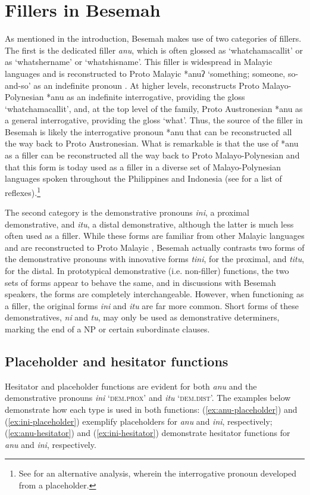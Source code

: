 \documentclass[output=paper,
\ChapterDOI{10.5281/zenodo.15697583}
colorlinks,
citecolor=brown]{langscibook}
\begin{document}
\section{Fillers in Besemah}\label{sec:fillers}
As mentioned in the introduction, Besemah makes use of two categories of fillers. The first is the dedicated filler \textit{anu}, which is often glossed as `whatchamacallit' or as `whatshername' or `whatshisname'. This filler is widespread in Malayic languages and is reconstructed to Proto Malayic *anuʔ `something; someone, so-and-so' as an indefinite pronoun \citep[128--129]{adelaar1992protomalayic}. At higher levels, \citet[516]{blust2013austronesian} reconstructs Proto Malayo-Polynesian *anu as an indefinite interrogative, providing the gloss `whatchamacallit', and, at the top level of the family, Proto Austronesian *anu as a general interrogative, providing the gloss `what'. Thus, the source of the filler in Besemah is likely the interrogative pronoun *anu that can be reconstructed all the way back to Proto Austronesian. What is remarkable is that the use of *anu as a filler can be reconstructed all the way back to Proto Malayo-Polynesian and that this form is today used as a filler in a diverse set of Malayo-Polynesian languages spoken throughout the Philippines and Indonesia (see \cite{blust2023acd} for a list of reflexes).\footnote{See \citet[][92--93]{nagaya2022tagalog} for an alternative analysis, wherein the interrogative pronoun developed from a placeholder.}

The second category is the demonstrative pronouns \textit{ini}, a proximal demonstrative, and \textit{itu}, a distal demonstrative, although the latter is much less often used as a filler. While these forms are familiar from other Malayic languages and are reconstructed to Proto Malayic \citep[129]{adelaar1992protomalayic}, Besemah actually contrasts two forms of the demonstrative pronouns with innovative forms \textit{tini}, for the proximal, and \textit{titu}, for the distal. In prototypical demonstrative (i.e. non-filler) functions, the two sets of forms appear to behave the same, and in discussions with Besemah speakers, the forms are completely interchangeable. However, when functioning as a filler, the original forms \textit{ini} and \textit{itu} are far more common. Short forms of these demonstratives, \textit{ni} and \textit{tu}, may only be used as demonstrative determiners, marking the end of a NP or certain subordinate clauses.

\subsection{Placeholder and hesitator functions}\label{sec:placeholder-filler}
Hesitator and placeholder functions are evident for both \textit{anu} and the demonstrative pronouns \textit{ini} `\textsc{dem.prox}' and \textit{itu} `\textsc{dem.dist}'. The examples below demonstrate how each type is used in both functions: (\ref{ex:anu-placeholder}) and (\ref{ex:ini-placeholder}) exemplify placeholders for \textit{anu} and \textit{ini}, respectively; (\ref{ex:anu-hesitator}) and (\ref{ex:ini-hesitator}) demonstrate hesitator functions for \textit{anu} and \textit{ini}, respectively.
\end{document}
